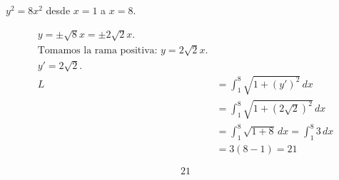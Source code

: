 $y^2=8x^2$ desde $x=1$ a $x=8$.

\nopagebreak
\begin{align*}
y = \pm \sqrt{8} x = \pm 2\sqrt{2} x. \\
\text{Tomamos la rama positiva: } y = 2\sqrt{2} x. \\
y' = 2\sqrt{2}. \\
L &= \int_{1}^{8} \sqrt{1 + (y')^2} \, dx \\
&= \int_{1}^{8} \sqrt{1 + (2\sqrt{2})^2} \, dx \\
&= \int_{1}^{8} \sqrt{1 + 8} \, dx = \int_{1}^{8} 3 \, dx \\
&= 3(8-1) = 21
\end{align*}

\[
\boxed{\displaystyle 21}
\]
